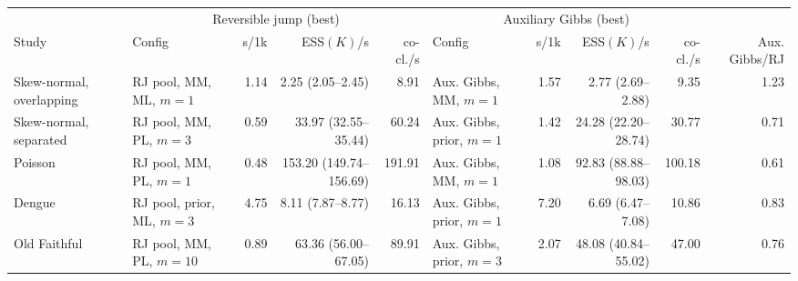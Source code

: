 \begin{tabular}{l lrrr lrrr r}
\toprule
 & \multicolumn{4}{c}{Reversible jump (best)} & \multicolumn{4}{c}{Auxiliary Gibbs (best)} & \\
\cmidrule(lr){2-5}\cmidrule(lr){6-9}
Study & Config & s/1k & ESS$(K)$/s & co-cl./s & Config & s/1k & ESS$(K)$/s & co-cl./s & Aux. Gibbs/RJ \\
\midrule
Skew-normal, overlapping & RJ pool, MM, ML, $m{=}1$ & 1.14 & 2.25 (2.05--2.45) & 8.91 & Aux. Gibbs, MM, $m{=}1$ & 1.57 & 2.77 (2.69--2.88) & 9.35 & 1.23 \\
Skew-normal, separated & RJ pool, MM, PL, $m{=}3$ & 0.59 & 33.97 (32.55--35.44) & 60.24 & Aux. Gibbs, prior, $m{=}1$ & 1.42 & 24.28 (22.20--28.74) & 30.77 & 0.71 \\
Poisson & RJ pool, MM, PL, $m{=}1$ & 0.48 & 153.20 (149.74--156.69) & 191.91 & Aux. Gibbs, MM, $m{=}1$ & 1.08 & 92.83 (88.88--98.03) & 100.18 & 0.61 \\
Dengue & RJ pool, prior, ML, $m{=}3$ & 4.75 & 8.11 (7.87--8.77) & 16.13 & Aux. Gibbs, prior, $m{=}1$ & 7.20 & 6.69 (6.47--7.08) & 10.86 & 0.83 \\
Old Faithful & RJ pool, MM, PL, $m{=}10$ & 0.89 & 63.36 (56.00--67.05) & 89.91 & Aux. Gibbs, prior, $m{=}3$ & 2.07 & 48.08 (40.84--55.02) & 47.00 & 0.76 \\
\bottomrule
\end{tabular}
